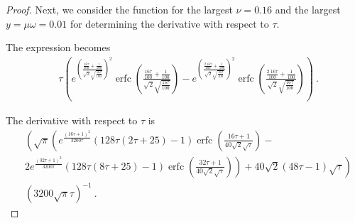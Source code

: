 \documentclass{article}
\DeclareMathOperator{\erfc}{erfc}
\begin{document}
\begin{proof}
Next,
we consider the function for  
the largest $\nu = 0.16$ and the largest $y=\mu \omega = 0.01$ 
for determining the derivative with respect to $\tau$. 


The expression becomes
\begin{align}
&\tau \left(e^{\left(\frac{\frac{16 \tau}{100}+\frac{1}{100}}{\sqrt{2} \sqrt{\frac{16 \tau}{100}}}\right)^2} \erfc \left(\frac{\frac{16 \tau}{100}+\frac{1}{100}}{\sqrt{2} \sqrt{\frac{16 \tau}{100}}}\right)- e^{\left(\frac{\frac{2\ 16 \tau}{100}+\frac{1}{100}}{\sqrt{2} \sqrt{\frac{16 \tau}{100}}}\right)^2} \erfc \left(\frac{\frac{2\ 16 \tau}{100}+\frac{1}{100}}{\sqrt{2} \sqrt{\frac{16 \tau}{100}}}\right)\right) \ .
\end{align}

The derivative with respect to $\tau$ is 
\begin{align}
&\left(\sqrt{\pi } \left(e^{\frac{(16 \tau+1)^2}{3200 \tau}} (128 \tau (2  \tau+25)-1) \erfc \left(\frac{16 \tau+1}{40 \sqrt{2} \sqrt{\tau}}\right)-\right.\right.\\\nonumber 
&\left.\left.2 e^{\frac{(32  \tau+1)^2}{3200 \tau}} (128 \tau (8 \tau+25)-1) \erfc \left(\frac{32  \tau+1}{40 \sqrt{2} \sqrt{\tau}}\right)\right)+40 \sqrt{2} (48 \tau-1) \sqrt{\tau}\right)\\ \nonumber 
&\left(3200 \sqrt{\pi } \tau\right)^{-1} \ .
\end{align}


\end{proof}
\end{document}
